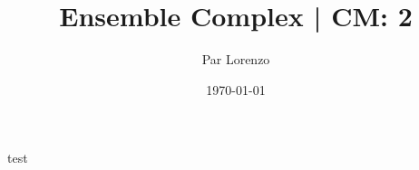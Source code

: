 \documentclass[a4paper, 12pt]{article}
\title{Ensemble Complex | CM: 2}
\author{Par Lorenzo}
\date{\today}
\begin{document}
    test
\end{document}
